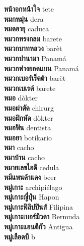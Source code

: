 \textbf{ หน้าอกหน้าใจ  } tete \\
\textbf{ หมกหมุ่น  } dera \\
\textbf{ หมดอายุ  } caduca \\
\textbf{ หมวกทรงกลม  } barete \\
\textbf{ หมวกบาทหลวง  } barèt \\
\textbf{ หมวกปานามา  } Panamá \\
\textbf{ หมวกฟางยอดแบน  } Panamá \\
\textbf{ หมวกเบอร์เร็ตต้า  } barèt \\
\textbf{ หมวกเบเรต์  } barete \\
\textbf{ หมอ  } dòkter \\
\textbf{ หมอผ่าตัด  } chirurg \\
\textbf{ หมอฝึกหัด  } dòkter \\
\textbf{ หมอฟัน  } dentista \\
\textbf{ หมอยา  } botikario \\
\textbf{ หมา  } cacho \\
\textbf{ หมาบ้าน  } cacho \\
\textbf{ หมายเลขไอดี  } cedula \\
\textbf{ หมีแพนด้าแดง  } beer \\
\textbf{ หมู่เกาะ  } archipiélago \\
\textbf{ หมู่เกาะญี่ปุ่น  } Hapon \\
\textbf{ หมู่เกาะฟิลิปปินส์  } Filipina \\
\textbf{ หมู่เกาะเบอร์มิวดา  } Bermuda \\
\textbf{ หมู่เกาะแอนติกัว  } Antigua \\
\textbf{ หมู่เลือดบี  } b \\
